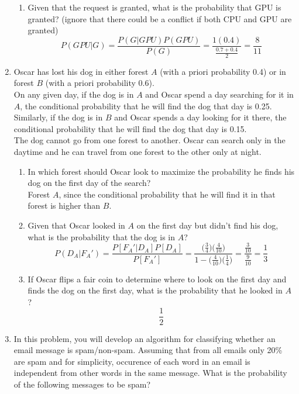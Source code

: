 \documentclass[10.5pt,letterpaper]{article}
\begin{document}
\begin{enumerate}[label=\textbf{Problem \arabic*.}]
\begin{enumerate}[label=\alph*)]
\item Given that the request is granted, what is the probability that GPU is granted? (ignore that there could be a conflict if both CPU and GPU are granted)
\[P(GPU|G)=\frac{P(G|GPU)P(GPU)}{P(G)}=\frac{1(0.4)}{\frac{0.7+0.4}{2}}=\frac{8}{11}\]
	\end{enumerate}
\item Oscar has lost his dog in either forest $A$ (with a priori probability 0.4) or in forest $B$ (with a priori probability 0.6).\\
On any given day, if the dog is in $A$ and Oscar spend a day searching for it in $A$, the conditional probability that he will find the dog that day is 0.25. Similarly, if the dog is in $B$ and Oscar spends a day looking for it there, the conditional probability that he will find the dog that day is 0.15.\\
The dog cannot go from one forest to another. Oscar can search only in the daytime and he can travel from one forest to the other only at night.
	\begin{enumerate}[label=\alph*)]
	\item In which forest should Oscar look to maximize the probability he finds his dog on the first day of the search?\\
	Forest $A$, since the conditional probability that he will find it in that forest is higher than $B$.
	\item Given that Oscar looked in $A$ on the first day but didn't find his dog, what is the probability that the dog is in $A$?\\
	\[P(D_A|F_A')=\frac{P[F_A'|D_A]P[D_A]}{P[F_A']}=\frac{\big(\frac{3}{4}\big)\big(\frac{4}{10}\big)}{1-\big(\frac{4}{10}\big)\big(\frac{1}{4}\big)}=\frac{\frac{3}{10}}{\frac{9}{10}}=\frac{1}{3}\]
	\item If Oscar flips a fair coin to determine where to look on the first day and finds the dog on the first day, what is the probability that he looked in $A$?
	\[\frac{1}{2}\]
	\end{enumerate}
\item In this problem, you will develop an algorithm for classifying whether an email message is spam/non-spam. Assuming that from all emails only 20\% are spam and for simplicity, occurence of each word in an email is independent from other words in the same message. What is the probability of the following messages to be spam?
\begin{center}
\begin{tabular}{ |c|c|c| }

\end{tabular}
\end{center}
\end{enumerate}
\end{document}
